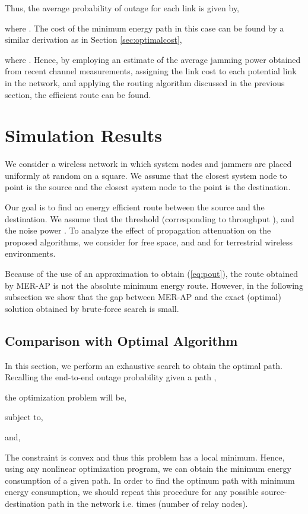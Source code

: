 \documentclass[10pt,journal]{IEEEtran}
\theoremstyle{definition}
\begin{document}
Thus, the average probability of outage for each link is given by,

where . The cost of the minimum energy  path   in this case can be found by a similar derivation as in Section \ref{sec:optimalcost},

where . 
Hence, by employing an estimate of the average jamming power obtained from recent channel measurements,   assigning the link cost  to each potential link  in the network, and applying the routing algorithm discussed in the previous section, the efficient route can be found.
\section{Simulation Results}\label{sec:numerical}
We consider a wireless network in which   system nodes and  jammers are placed uniformly at random on a  square. We assume that the closest system node to point  is the source and the closest system node to the point  is the destination.
 
 Our goal is to find an energy efficient route between the source and the destination. 
We assume that the threshold  (corresponding to throughput ), and the noise power .
To analyze  the effect of propagation attenuation on the proposed algorithms, we consider   for free space, and  and  for  terrestrial wireless environments.




{Because of the use of an approximation to obtain (\ref{eq:pout}), the  route obtained by MER-AP is not the absolute minimum energy route. 
However, in the following subsection we show that the gap between MER-AP and the exact (optimal) solution obtained by brute-force search 
is small.}

{{\subsection{Comparison with Optimal Algorithm}}}
{In this section, we perform an exhaustive search to obtain the optimal path. 
		Recalling the end-to-end outage probability given a path , 
		
		the optimization problem will be,
		
		subject to,
		
		and,
		
		The constraint is convex and thus this problem has a local minimum. Hence, using any 
		nonlinear optimization program, we can obtain the minimum energy consumption of a given path. 
		In order to find the optimum path with minimum energy consumption, we should repeat this procedure for 
		any possible source-destination path in the network i.e.   times (number of relay nodes).
		}
		
\end{document}
